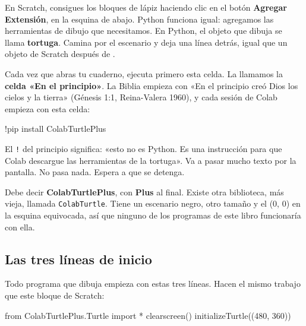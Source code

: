 En Scratch, consigues los bloques de lápiz haciendo clic en el botón \textbf{Agregar Extensión}, en la esquina de abajo. Python funciona igual: agregamos las herramientas de dibujo que necesitamos. En Python, el objeto que dibuja se llama \textbf{tortuga}. Camina por el escenario y deja una línea detrás, igual que un objeto de Scratch después de .

Cada vez que abras tu cuaderno, ejecuta primero esta celda. La llamamos la \textbf{celda «En el principio»}. La Biblia empieza con «En el principio creó Dios los cielos y la tierra» (Génesis 1:1, Reina-Valera 1960), y cada sesión de Colab empieza con esta celda:

\begin{typethis}
!pip install ColabTurtlePlus
\end{typethis}

El \texttt{!} del principio significa: «esto no es Python. Es una instrucción para que Colab descargue las herramientas de la tortuga». Va a pasar mucho texto por la pantalla. No pasa nada. Espera a que se detenga.

\begin{watchout}
Debe decir \textbf{ColabTurtlePlus}, con \textbf{Plus} al final. Existe otra biblioteca, más vieja, llamada \texttt{ColabTurtle}. Tiene un escenario negro, otro tamaño y el (0, 0) en la esquina equivocada, así que ninguno de los programas de este libro funcionaría con ella.
\end{watchout}

\subsection*{Las tres líneas de inicio}

Todo programa que dibuja empieza con estas tres líneas. Hacen el mismo trabajo que este bloque de Scratch:\par{}

\begin{typethis}
from ColabTurtlePlus.Turtle import *
clearscreen()
initializeTurtle((480, 360))
\end{typethis}

